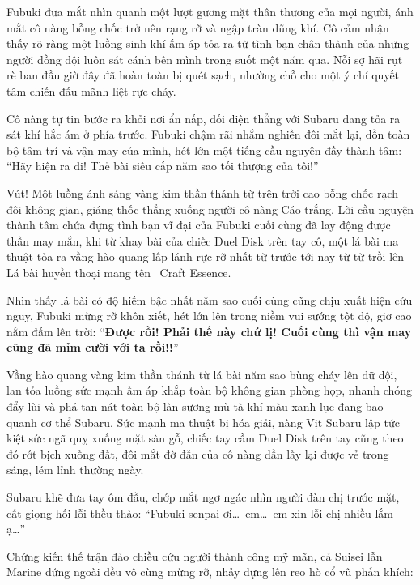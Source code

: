 \documentclass[../main.tex]{subfiles}
\begin{document}

Fubuki đưa mắt nhìn quanh một lượt gương mặt thân thương của mọi người, ánh mắt cô nàng bỗng chốc trở nên rạng rỡ và ngập tràn dũng khí. Cô cảm nhận thấy rõ ràng một luồng sinh khí ấm áp tỏa ra từ tình bạn chân thành của những người đồng đội luôn sát cánh bên mình trong suốt một năm qua. Nỗi sợ hãi rụt rè ban đầu giờ đây đã hoàn toàn bị quét sạch, nhường chỗ cho một ý chí quyết tâm chiến đấu mãnh liệt rực cháy.

Cô nàng tự tin bước ra khỏi nơi ẩn nấp, đối diện thẳng với Subaru đang tỏa ra sát khí hắc ám ở phía trước. Fubuki chậm rãi nhắm nghiền đôi mắt lại, dồn toàn bộ tâm trí và vận may của mình, hét lớn một tiếng cầu nguyện đầy thành tâm: ``Hãy hiện ra đi! Thẻ bài siêu cấp năm sao tối thượng của tôi!''

Vút! Một luồng ánh sáng vàng kim thần thánh từ trên trời cao bỗng chốc rạch đôi không gian, giáng thốc thẳng xuống người cô nàng Cáo trắng. Lời cầu nguyện thành tâm chứa đựng tình bạn vĩ đại của Fubuki cuối cùng đã lay động được thần may mắn, khi từ khay bài của chiếc Duel Disk trên tay cô, một lá bài ma thuật tỏa ra vầng hào quang lấp lánh rực rỡ nhất từ trước tới nay từ từ trồi lên - Lá bài huyền thoại mang tên \hll\ Craft Essence.


Nhìn thấy lá bài có độ hiếm bậc nhất năm sao cuối cùng cũng chịu xuất hiện cứu nguy, Fubuki mừng rỡ khôn xiết, hét lớn lên trong niềm vui sướng tột độ, giơ cao nắm đấm lên trời: ``\textbf{Được rồi! Phải thế này chứ lị! Cuối cùng thì vận may cũng đã mỉm cười với ta rồi!!}''

Vầng hào quang vàng kim thần thánh từ lá bài năm sao bùng cháy lên dữ dội, lan tỏa luồng sức mạnh ấm áp khắp toàn bộ không gian phòng họp, nhanh chóng đẩy lùi và phá tan nát toàn bộ làn sương mù tà khí màu xanh lục đang bao quanh cơ thể Subaru. Sức mạnh ma thuật bị hóa giải, nàng Vịt Subaru lập tức kiệt sức ngã quỵ xuống mặt sàn gỗ, chiếc tay cầm Duel Disk trên tay cũng theo đó rớt bịch xuống đất, đôi mắt đờ đẫn của cô nàng dần lấy lại được vẻ trong sáng, lém lỉnh thường ngày.

Subaru khẽ đưa tay ôm đầu, chớp mắt ngơ ngác nhìn người đàn chị trước mặt, cất giọng hối lỗi thều thào: ``Fubuki-senpai ơi\dots\ em\dots\ em xin lỗi chị nhiều lắm ạ\dots''

Chứng kiến thế trận đảo chiều cứu người thành công mỹ mãn, cả Suisei lẫn Marine đứng ngoài đều vô cùng mừng rỡ, nhảy dựng lên reo hò cổ vũ phấn khích:
\end{document}
